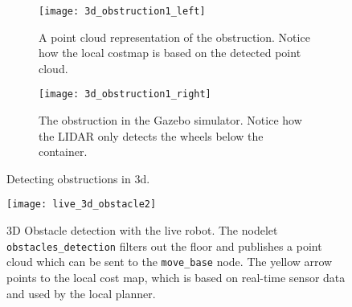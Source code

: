 \begin{figure}
	\centering
	\begin{subfigure}[b]{0.53\textwidth}
		\texttt{[image: 3d\_obstruction1\_left]}
		\caption{A point cloud representation of the obstruction. Notice how the local costmap is based on the detected point cloud.}
		\label{fig:device_select}
	\end{subfigure}
		\begin{subfigure}[b]{0.45\textwidth}
			\texttt{[image: 3d\_obstruction1\_right]}
			\caption{The obstruction in the Gazebo simulator. Notice how the LIDAR only detects the wheels below the container.}
			\label{fig:bt_request}
		\end{subfigure}
	\caption{\label{fig:3d_obstruction1}Detecting obstructions in 3d.}
\end{figure}

\begin{figure}[h]
	\centering
	\texttt{[image: live\_3d\_obstacle2]}
	\caption{3D Obstacle detection with the live robot. The nodelet \texttt{obstacles\_detection} filters out the floor and publishes a point cloud which can be sent to the \texttt{move\_base} node. The yellow arrow points to the local cost map, which is based on real-time sensor data and used by the local planner.}
	\label{fig:live_3d_obstacle2}
\end{figure}